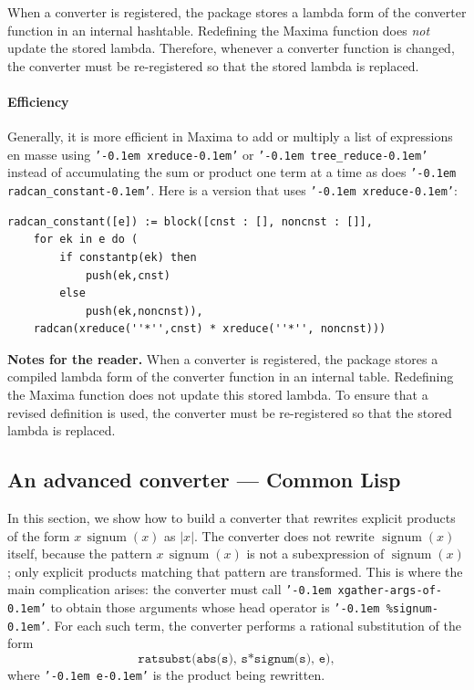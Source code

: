 \documentclass[12pt,fleqn]{extarticle}
\newcommand{\ttq}[1]{\texttt{'\kern-0.1em #1\kern-0.1em'}}
\newenvironment{maximabox}
  {\begin{tcolorbox}[
      breakable,
      enhanced,
      colback=white,
      colframe=black!8,
      boxrule=0pt,
      borderline west={2.2pt}{0pt}{black!25},
      arc=1pt,
      left=11pt,
      right=7pt,
      top=9pt,
      bottom=9pt,
      before skip=14pt,
      after skip=14pt
    ]}
  {\end{tcolorbox}}
\DeclareMathOperator{\signum}{signum}
\begin{document}
\noindent
When a converter is registered, the package stores a lambda form of the converter function in an internal hashtable. Redefining the Maxima function does \emph{not} update the stored lambda. Therefore, whenever a converter function is changed, the converter must be re-registered so that the stored lambda is replaced.
\paragraph{Efficiency}

Generally, it is more efficient in Maxima to add or multiply a list of expressions en masse 
using \ttq{xreduce} or \ttq{tree\_reduce} instead of accumulating the sum or product one 
term at a time as does \ttq{radcan\_constant}. Here is a version that uses \ttq{xreduce}:
\begin{maximabox}
\begin{verbatim}
radcan_constant([e]) := block([cnst : [], noncnst : []],
    for ek in e do (
        if constantp(ek) then
            push(ek,cnst)
        else
            push(ek,noncnst)),
    radcan(xreduce(''*'',cnst) * xreduce(''*'', noncnst)))
\end{verbatim}
\end{maximabox}


\begin{notebox}
\textbf{Notes for the reader.}
When a converter is registered, the package stores a compiled lambda form of the
converter function in an internal table. Redefining the Maxima function does not
update this stored lambda. To ensure that a revised definition is used, the
converter must be re-registered so that the stored lambda is replaced.
\end{notebox}


\subsection{An advanced converter --- Common Lisp}

In this section, we show how to build a converter that rewrites explicit products
of the form $x \,\signum(x)$ as $|x|$. The converter does not rewrite
$\signum(x)$ itself, because the pattern $x \,\signum(x)$ is not a subexpression
of $\signum(x)$; only explicit products matching that pattern are transformed.
This is where the main complication arises: the converter must call
\ttq{xgather-args-of} to obtain those arguments whose head operator is
\ttq{\%signum}. For each such term, the converter performs a rational
substitution of the form
\[
   \texttt{ratsubst(abs(s), s*signum(s), e)},
\]
where \ttq{e} is the product being rewritten.
\end{document}
